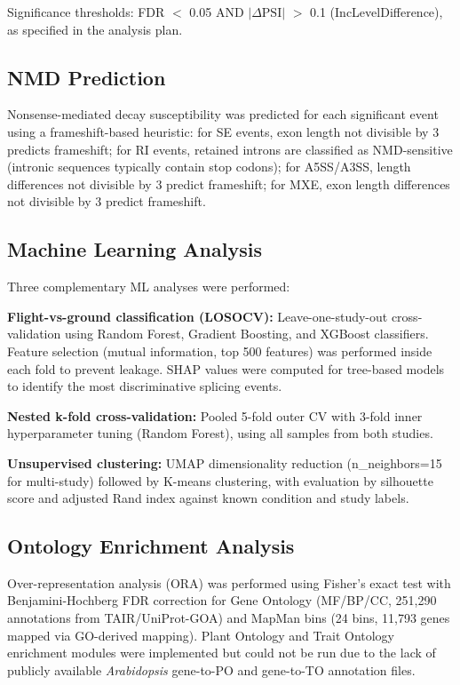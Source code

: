 \documentclass[12pt,a4paper]{article}
\begin{document}
Significance thresholds: FDR $<$ 0.05 AND $|\Delta\text{PSI}|$ $>$ 0.1 (IncLevelDifference), as specified in the analysis plan.

\subsection{NMD Prediction}

Nonsense-mediated decay susceptibility was predicted for each significant event using a frameshift-based heuristic: for SE events, exon length not divisible by 3 predicts frameshift; for RI events, retained introns are classified as NMD-sensitive (intronic sequences typically contain stop codons); for A5SS/A3SS, length differences not divisible by 3 predict frameshift; for MXE, exon length differences not divisible by 3 predict frameshift.

\subsection{Machine Learning Analysis}

Three complementary ML analyses were performed:

\textbf{Flight-vs-ground classification (LOSOCV):} Leave-one-study-out cross-validation using Random Forest, Gradient Boosting, and XGBoost classifiers. Feature selection (mutual information, top 500 features) was performed inside each fold to prevent leakage. SHAP values were computed for tree-based models to identify the most discriminative splicing events.

\textbf{Nested k-fold cross-validation:} Pooled 5-fold outer CV with 3-fold inner hyperparameter tuning (Random Forest), using all samples from both studies.

\textbf{Unsupervised clustering:} UMAP dimensionality reduction (n\_neighbors=15 for multi-study) followed by K-means clustering, with evaluation by silhouette score and adjusted Rand index against known condition and study labels.

\subsection{Ontology Enrichment Analysis}

Over-representation analysis (ORA) was performed using Fisher's exact test with Benjamini-Hochberg FDR correction for Gene Ontology (MF/BP/CC, 251,290 annotations from TAIR/UniProt-GOA) and MapMan bins (24 bins, 11,793 genes mapped via GO-derived mapping). Plant Ontology and Trait Ontology enrichment modules were implemented but could not be run due to the lack of publicly available \textit{Arabidopsis} gene-to-PO and gene-to-TO annotation files.
\end{document}
